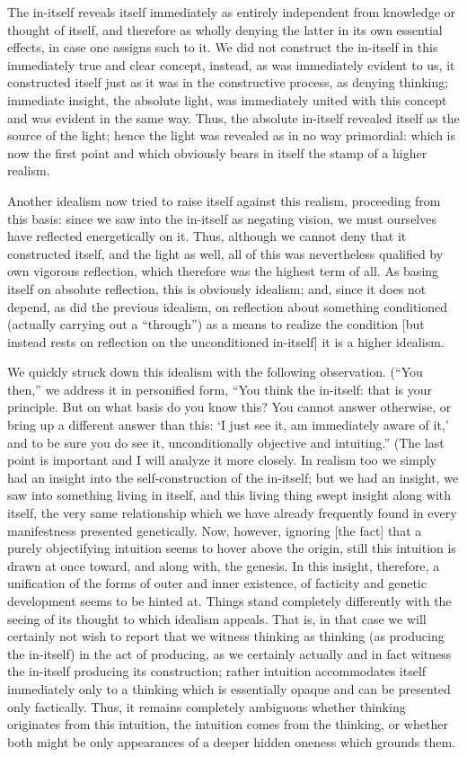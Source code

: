 The in-itself reveals itself immediately
as entirely independent from knowledge or thought of itself,
and therefore as wholly denying the latter
in its own essential effects, in case one assigns such to it.
We did not construct the in-itself
in this immediately true and clear concept,
instead, as was immediately evident to us,
it constructed itself just as it was
in the constructive process, as denying thinking;
immediate insight, the absolute light, was
immediately united with this concept
and was evident in the same way.
Thus, the absolute in-itself revealed itself
as the source of the light;
hence the light was revealed
as in no way primordial:
which is now the first point
and which obviously bears in itself
the stamp of a higher realism.

Another idealism now tried to raise itself
against this realism, proceeding from this basis:
since we saw into the in-itself as negating vision,
we must ourselves have reflected energetically on it.
Thus, although we cannot deny that it constructed itself,
and the light as well, all of this was nevertheless
qualified by own vigorous reflection,
which therefore was the highest term of all.
As basing itself on absolute reflection,
this is obviously idealism;
and, since it does not depend,
as did the previous idealism,
on reflection about something conditioned
(actually carrying out a “through”)
as a means to realize the condition
[but instead rests on reflection
on the unconditioned in-itself]
it is a higher idealism.

We quickly struck down this idealism
with the following observation.
(“You then,” we address it in personified form,
“You think the in-itself: that is your principle.
But on what basis do you know this?
You cannot answer otherwise,
or bring up a different answer than this:
‘I just see it, am immediately aware of it,’
and to be sure you do see it,
unconditionally objective and intuiting.”
(The last point is important and I will analyze it more closely.
In realism too we simply had an insight
into the self-construction of the in-itself;
but we had an insight, we saw into something living in itself,
and this living thing swept insight along with itself,
the very same relationship which we have already frequently found
in every manifestness presented genetically.
Now, however, ignoring [the fact] that
a purely objectifying intuition seems
to hover above the origin,
still this intuition is drawn at once toward,
and along with, the genesis.
In this insight, therefore,
a unification of the forms
of outer and inner existence,
of facticity and genetic development
seems to be hinted at.
Things stand completely differently with the seeing of
its thought to which idealism appeals.
That is, in that case we will certainly
not wish to report that we witness thinking as thinking
(as producing the in-itself)
in the act of producing, as we certainly actually and in fact witness
the in-itself producing its construction;
rather intuition accommodates itself immediately only to
a thinking which is essentially opaque
and can be presented only factically.
Thus, it remains completely ambiguous
whether thinking originates from this intuition,
the intuition comes from the thinking,
or whether both might be only appearances
of a deeper hidden oneness which grounds them.

